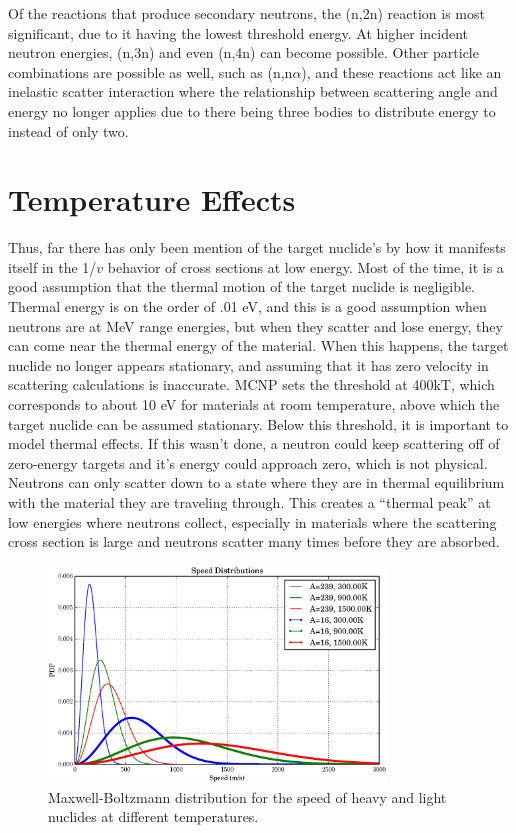 Of the reactions that produce secondary neutrons, the (n,2n) reaction is most significant, due to it having the lowest threshold energy.  At higher incident neutron energies, (n,3n) and even (n,4n) can become possible.  Other particle combinations are possible as well, such as (n,n$\alpha$), and these reactions act like an inelastic scatter interaction where the relationship between scattering angle and energy no longer applies due to there being three bodies to distribute energy to instead of only two.

\section{Temperature Effects}
\label{sec:temp}

Thus, far there has only been mention of the target nuclide's by how it manifests itself in the 1/$v$ behavior of cross sections at low energy.  Most of the time, it is a good assumption that the thermal motion of the target nuclide is negligible.  Thermal energy is on the order of .01 eV, and this is a good assumption when neutrons are at MeV range energies, but when they scatter and lose energy, they can come near the thermal energy of the material.  When this happens, the target nuclide no longer appears stationary, and assuming that it has zero velocity in scattering calculations is inaccurate.  MCNP sets the threshold at 400kT, which corresponds to about 10 eV for materials at room temperature, above which the target nuclide can be assumed stationary.  Below this threshold, it is important to model thermal effects.  If this wasn't done, a neutron could keep scattering off of zero-energy targets and it's energy could approach zero, which is not physical.  Neutrons can only scatter down to a state where they are in thermal equilibrium with the material they are traveling through.  This creates a ``thermal peak'' at low energies where neutrons collect, especially in materials where the scattering cross section is large and neutrons scatter many times before they are absorbed.

\begin{figure}[h!]
  \label{MB_dist}
  \centering
    \includegraphics[width=0.8\textwidth]{graphics/MB_dist.eps}
     \caption{Maxwell-Boltzmann distribution for the speed of heavy and light nuclides at different temperatures.}
\end{figure}


